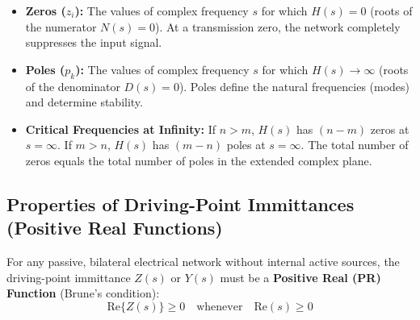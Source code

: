 \documentclass[12pt,a4paper]{article}
\begin{document}
\begin{tcolorbox}[defbox, title={\textbf{Poles and Zeros}}]
\begin{itemize}[leftmargin=*]
  \item \textbf{Zeros ($z_i$):} The values of complex frequency $s$ for which $H(s) = 0$ (roots of the numerator $N(s) = 0$). At a transmission zero, the network completely suppresses the input signal.
  \item \textbf{Poles ($p_k$):} The values of complex frequency $s$ for which $H(s) \to \infty$ (roots of the denominator $D(s) = 0$). Poles define the natural frequencies (modes) and determine stability.
  \item \textbf{Critical Frequencies at Infinity:} If $n > m$, $H(s)$ has $(n - m)$ zeros at $s = \infty$. If $m > n$, $H(s)$ has $(m - n)$ poles at $s = \infty$. The total number of zeros equals the total number of poles in the extended complex plane.
\end{itemize}
\end{tcolorbox}

\subsection{Properties of Driving-Point Immittances (Positive Real Functions)}

For any passive, bilateral electrical network without internal active sources, the driving-point immittance $Z(s)$ or $Y(s)$ must be a \textbf{Positive Real (PR) Function} (Brune's condition):
\begin{equation}
  \text{Re}\{Z(s)\} \ge 0 \quad \text{whenever} \quad \text{Re}(s) \ge 0
\end{equation}
\end{document}
